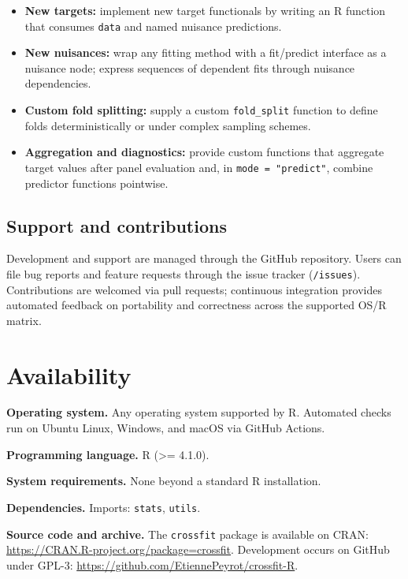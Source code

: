 \begin{itemize}
\tightlist
\item
  \textbf{New targets:} implement new target functionals by writing an R function that consumes \texttt{data} and named nuisance predictions.
\item
  \textbf{New nuisances:} wrap any fitting method with a fit/predict interface as a nuisance node; express sequences of dependent fits through nuisance dependencies.
\item
  \textbf{Custom fold splitting:} supply a custom \texttt{fold\_split} function to define folds deterministically or under complex sampling schemes.
\item
  \textbf{Aggregation and diagnostics:} provide custom functions that aggregate target values after panel evaluation and, in \texttt{mode\ =\ "predict"}, combine predictor functions pointwise.
\end{itemize}

\subsection{Support and contributions}\label{support-and-contributions}

Development and support are managed through the GitHub repository. Users can file bug reports and feature requests through the issue tracker (\texttt{/issues}). Contributions are welcomed via pull requests; continuous integration provides automated feedback on portability and correctness across the supported OS/R matrix.

\section*{Availability}\label{availability}

\textbf{Operating system.} Any operating system supported by R. Automated checks run on Ubuntu Linux, Windows, and macOS via GitHub Actions.

\textbf{Programming language.} R (\textgreater= 4.1.0).

\textbf{System requirements.} None beyond a standard R installation.

\textbf{Dependencies.} Imports: \texttt{stats}, \texttt{utils}.

\textbf{Source code and archive.} The \texttt{crossfit} package is available on CRAN: \url{https://CRAN.R-project.org/package=crossfit}. Development occurs on GitHub under GPL-3: \url{https://github.com/EtiennePeyrot/crossfit-R}.

